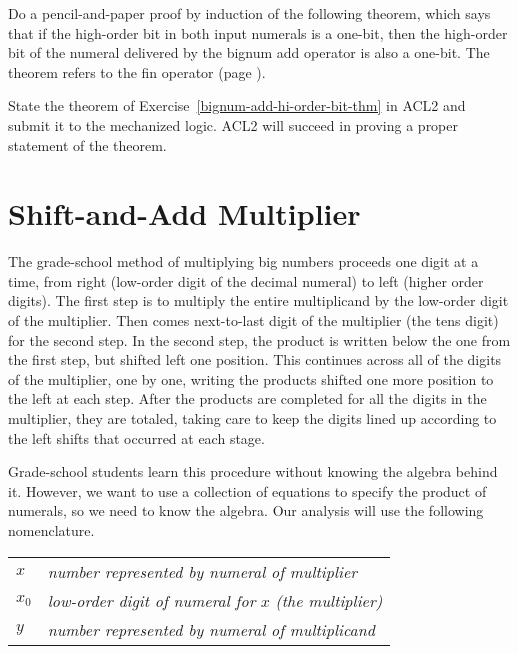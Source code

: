 \begin{ExerciseList}
\Exercise \label{bignum-add-hi-order-bit-thm}
Do a pencil-and-paper proof by induction of the following
theorem, which says that if the high-order bit in both input numerals is a one-bit,
then the high-order bit of the numeral delivered
by the bignum add operator is also a one-bit.
The theorem refers to the fin operator (page \pageref{fin-defun}).

\Exercise State the theorem of Exercise~\ref{bignum-add-hi-order-bit-thm}
in ACL2 and submit it to the mechanized logic.
ACL2 will succeed in proving a proper statement of the theorem.
\end{ExerciseList}

\section{Shift-and-Add Multiplier}
\label{sec:bignum-mult}

The grade-school method of multiplying big numbers proceeds one digit at a time,
from right (low-order digit of the decimal numeral) to left (higher order digits).
The first step is to multiply the entire multiplicand by the low-order digit
of the multiplier.
Then comes next-to-last digit of the multiplier (the tens digit) for the second step.
In the second step, the product is written below the one from the first step,
but shifted left one position.
This continues across all of the digits of the multiplier, one by one,
writing the products shifted one more position to the left at each step.
After the products are completed for
all the digits in the multiplier, they are totaled, taking care to keep
the digits lined up according to the left shifts that occurred at each stage.

Grade-school students learn this procedure without knowing
the algebra behind it. However, we want to use a collection of
equations to specify the product of numerals, so we need
to know the algebra. Our analysis will use the following nomenclature.

\begin{center}
\begin{tabular}{ll}
$x$       &\emph{number represented by numeral of multiplier} \\
$x_0$     &\emph{low-order digit of numeral for} $x$ \emph{(the multiplier) } \\
$y$       &\emph{ number represented by numeral of multiplicand} \\
\end{tabular}
\end{center}

